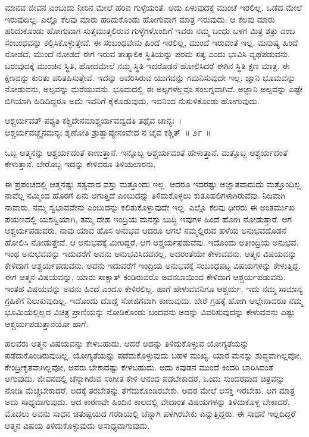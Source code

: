 ಮಾನವ ಜೀವನ ಎಂಬುದು ನೀರಿನ ಮೇಲೆ ಹರಿವ ಗುಳ್ಳೆಯಂತೆ. ಅದು ಏಳುವುದಕ್ಕೆ ಮುಂಚೆ ಇರಲಿಲ್ಲ. ಒಡೆದ ಮೇಲೆ ಇರುವುದಿಲ್ಲ. ಎಲ್ಲೊ ಕೆಲವು ಮಾರು ಹರಿದುಕೊಂಡು ಹೋಗುವಾಗ ಮಾತ್ರ ಇರುವುದು. ಆ ಕೆಲವು ಮಾರು ಹರಿದುಕೊಂಡು ಹೋಗುವಾಗ ಸುತ್ತಮುತ್ತಲಿರುವ ಗುಳ್ಳೆಗಳೊಂದಿಗೆ ಇವರು ನಮ್ಮ ಬಂಧು ಬಳಗ ಮಿತ್ರ ಶತ್ರು ಎಂಬ ಸಂಬಂಧವನ್ನು ಕಲ್ಪಿಸಿಕೊಳ್ಳುತ್ತೇವೆ. ಈ ಸಂಬಂಧವೇನು ಹಿಂದೆ ಇರಲಿಲ್ಲ, ಮುಂದೆ ಇರುವಂತೆ ಇಲ್ಲ. ಮನುಷ್ಯ ಹಿಂದೆ ನೋಡದೆ, ಮುಂದೆ ನೋಡದೆ ಈಗ ಇರುವ ತಾತ್ಕಾಲಿಕ ಸ್ಥಿತಿಯನ್ನು ಪರಮ ಸತ್ಯ ಎಂದು ಭಾವಿಸಿ ವ್ಯಥೆಪಡುವನು. ಬರುವುದಕ್ಕೆ ಮುಂಚಿನ ಸ್ಥಿತಿ, ಹೋದಮೇಲೆ ನಮ್ಮ ಸ್ಥಿತಿ ಇದರೊಡನೆ ಹೋಲಿಸಿದರೆ ಈಗಿನ ಸ್ಥಿತಿ ಕ್ಷಣ ಮಾತ್ರ. ಈ ಕ್ಷಣವನ್ನು ಕುರಿತು ಪರಿತಪಿಸುತ್ತೇವೆ. ಇದನ್ನು ಆವರಿಸಿರುವ ಯುಗವನ್ನು ಗಮನಿಸುವುದೇ ಇಲ್ಲ. ಜ್ಞಾನಿ ಭೂಮವನ್ನು ನೋಡುವನು, ಅಲ್ಪವನ್ನು ಮರೆಯುವನು. ಭೂಮದಲ್ಲಿ ಈ ಅಲ್ಪಗಳೆಲ್ಲವೂ ಸಂಲಗ್ನವಾಗಿವೆ. ಅಜ್ಞಾನಿ ಅಲ್ಪವನ್ನು ಎಷ್ಟೇ ಬಿಗಿಯಾಗಿ ಹಿಡಿದಿದ್ದರೂ ಅದು ಇವನಿಗೆ ಕೈಕೊಡುವುದು, ಇವನಿಂದ ನುಸುಳಿಕೊಂಡು ಹೋಗುವುದು.

\begin{shloka}
ಆಶ್ಚರ್ಯವತ್ ಪಶ್ಯತಿ ಕಶ್ಚಿದೇನಮಾಶ್ಚರ್ಯವದ್ವದತಿ ತಥೈವ ಚಾನ್ಯಃ~।\\ಆಶ್ಚರ್ಯವಚ್ಚೈನಮನ್ಯಃ ಶೃಣೋತಿ ಶ್ರುತ್ವಾಪ್ಯೇನಂ\hfill\break ವೇದ ನ ಚೈವ ಕಶ್ಚಿತ್\hfill~॥ ೨೯~॥
\end{shloka}

\begin{artha}
ಒಬ್ಬ ಆತ್ಮನನ್ನು ಆಶ್ಚರ್ಯದಂತೆ ಕಾಣುತ್ತಾನೆ. ಇನ್ನೊಬ್ಬ ಆಶ್ಚರ್ಯದಂತೆ ಹೇಳುತ್ತಾನೆ. ಮತ್ತೊಬ್ಬ ಆಶ್ಚರ್ಯದಂತೆ ಕೇಳುತ್ತಾನೆ. ಬೇರೊಬ್ಬ ಇದನ್ನು ಕೇಳಿದರೂ ತಿಳಿಯಲಾರನು.
\end{artha}

ಈ ಪ್ರಪಂಚದಲ್ಲಿ ಆತ್ಮನಷ್ಟು ಸತ್ಯವಾದ ವಸ್ತು ಮತ್ತೊಂದು ಇಲ್ಲ. ಆದರೂ ಇದರಷ್ಟು ಅಜ್ಞಾತವಾದುದು ಮತ್ತೊಂದಿಲ್ಲ. ನಾವೆಲ್ಲ ನಮ್ಮಿಂದ ಹೊರಗೆ ಏನು ಆಗುತ್ತಿದೆ ಎಂಬುದನ್ನು ತಿಳಿದುಕೊಳ್ಳಲು ಕುತೂಹಲಿಗಳಾಗಿರುವೆವು. ನಿಜವಾಗಿ ನಾವಾರು, ನಮ್ಮ ಸ್ವಭಾವವೇನು ಎಂಬು\-ದನ್ನು ಕಲಿತುಕೊಳ್ಳುವುದೇ ಇಲ್ಲ. ಎಲ್ಲೊ ಕೆಲವು ಧೀರರು ಈ ಅಂತರ್ಮುಖ ಪಯಣದಲ್ಲಿ ಯಶಸ್ವಿಯಾಗಿ, ತಮ್ಮ ದೇಹ ಇಂದ್ರಿಯ ಮನಸ್ಸು ಬುದ್ಧಿ ಇವುಗಳ ಹಿಂದೆ ಹೋಗಿ ನೋಡುತ್ತಾರೆ. ಆಗ ಆಶ್ಚರ್ಯಪಡುವರು. ನಾವು ಯಾವ ಹೊಸ ಅನುಭವ ಆದರೂ ಆಗಲೆ ನಮ್ಮಲ್ಲಿರುವ ಹಳೆಯ ಅನುಭವದೊಡನೆ ಹೋಲಿಸಿ ನೋಡುತ್ತೇವೆ. ಆ ಅನುಭವಕ್ಕೆ ಮೀರಿದ್ದರೆ, ಆಗ ಆಶ್ಚರ್ಯಪಡುವೆವು. ಇದೊಂದು ಅತೀಂದ್ರಿಯ ಅನುಭವ. ಇಂಥ ಅನುಭವವನ್ನು ಇದುವರೆಗೆ ಅವನು ಅನುಭವಿಸಿದವನಲ್ಲ. ಅದರಂತೆಯೇ ಕೇಳುವವನು. ಆತ್ಮನ ವಿಷಯವನ್ನು ಕೇಳಿದಾಗ ಆಶ್ಚರ್ಯಪಡುವನು. ಅವನು ಇದುವರೆಗೆ ಇಂದ್ರಿಯ ಅನುಭವಕ್ಕೆ ಸಂಬಂಧಪಟ್ಟ ವಿಷಯಗಳನ್ನು ಕೇಳುತ್ತಿದ್ದ. ಈಗ ಆತ್ಮನ ವಿಷಯವನ್ನು, ಯಾರು ಸಾಕ್ಷಾತ್ ಕಂಡಿರುವರೊ ಅವನ\break ಬಾಯಿಂದ ಕೇಳಿದಾಗ ಆಶ್ಚರ್ಯಪಡುವನು. ಇಂತಹ ವಿಷಯವನ್ನು ಅವನು ಹಿಂದೆ ಎಂದೂ ಕೇಳಿರಲಿಲ್ಲ. ಹಾಗೆ ಹೇಳುವವನಿಗೂ ಆಶ್ಚರ್ಯ. ಇದು ನಮ್ಮ ಸಾಮಾನ್ಯ ಗ್ರಹಿಕೆಗೆ ನಿಲುಕುವುದಿಲ್ಲ. ಇದೊಂದು ದೊಡ್ಡ ಸೋಜಿಗವಾಗಿ ಕಾಣುವುದು. ಬೇರೆ ಗ್ರಹಕ್ಕೆ ಹೋಗಿ ಅಲ್ಲೇನಾದರೂ ನಮ್ಮ ಭೂಮಿಯಲ್ಲಿಲ್ಲದ ವಿಚಿತ್ರ ಪ್ರಾಣಿಯನ್ನು ನೋಡಿಕೊಂಡು ಬಂದವನು ಅದನ್ನು ವಿವರಿಸುವುದನ್ನು ಕೇಳುವವನು ಎಷ್ಟು ಆಶ್ಚರ್ಯಪಡುತ್ತಾನೆಯೋ ಹಾಗೆ.

ಹಲವರು ಆತ್ಮನ ವಿಷಯವನ್ನು ಕೇಳಬಹುದು. ಆದರೆ ಅದನ್ನು ತಿಳಿದುಕೊಳ್ಳುವ ಯೋಗ್ಯತೆಯನ್ನು ಪಡೆದುಕೊಂಡಿರುವುದಿಲ್ಲ. ಯೋಗ್ಯತೆಯನ್ನು ಪಡೆದುಕೊಳ್ಳುವುದು ಬಹಳ ಮುಖ್ಯ. ಯಾರ ಮನಸ್ಸು ಶುದ್ಧವಾಗಿಲ್ಲವೋ, ಕೇಂದ್ರೀಕೃತವಾಗಿಲ್ಲವೋ, ಅವರು ಬೇಕಾದಷ್ಟು ಕೇಳಬಹುದು. ಅದು ಕಿವುಡನ ಮುಂದೆ ಕಿಂದರಿ ಬಾರಿಸಿದಂತೆ ಆಗುವುದು. ಜೀವನದಲ್ಲಿ ಚೆನ್ನಾಗಿರುವ ಸಂಗೀತ ಕೇಳಿ ಆನಂದ ಪಡಬೇಕಾದರೆ, ಒಂದು ಸುಂದರವಾದ ಚಿತ್ರವನ್ನು ನೋಡಿ ಮೆಚ್ಚಬೇಕಾದರೆ, ಅದಕ್ಕೆ ತರಬೇತನ್ನು ತೆಗೆದುಕೊಂಡಿರಬೇಕು. ಅದರ ಮೇಲೆ ಆಸಕ್ತಿ ಇರಬೇಕು. ಆಗ ಮಾತ್ರ ಅದು ಸಾಧ್ಯವಾಗುವುದು. ಆದ ಕಾರಣವೇ ಹಿಂದಿನ ಕಾಲದಲ್ಲಿ ವೇದಾಂತ ವಿಷಯಗಳನ್ನು ತಿಳಿದುಕೊಳ್ಳ ಬೇಕಾದರೆ, ಮೊದಲು ಅವನು ಸಾಧನ ಚತುಷ್ಟಯದ ಗರಡಿಯಲ್ಲಿ ಚೆನ್ನಾಗಿ ಪಳಗಿರಬೇಕು ಎನ್ನುತ್ತಿದ್ದರು. ಈ ಸಾಧನೆ ಇಲ್ಲದಿದ್ದರೆ ಆತ್ಮನ ವಿಷಯ ತಿಳಿದುಕೊಳ್ಳುವುದು ಅಸಾಧ್ಯವಾಗುವುದು.

